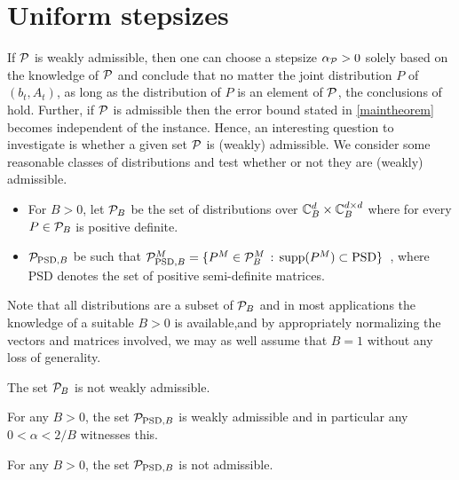 \section{Uniform stepsizes}
If $\P$ is weakly admissible, then one can choose a stepsize $\alpha_{\P}>0$ solely based on the knowledge of $\P$ and
conclude that no matter the joint distribution $P$ of $(b_t,A_t)$, as long as the distribution of $P$ is an element of $\P$, the conclusions of  hold. Further, if $\P$ is admissible then the error bound stated in  \cref{maintheorem} becomes independent of the instance. Hence, an interesting question to investigate is whether a given set $\P$ is (weakly) admissible. We consider some reasonable classes of distributions and test whether or not they are (weakly) admissible.
\begin{definition}
\begin{itemize}[leftmargin=*, before = \leavevmode\vspace{-\baselineskip}]
\item For $B>0$, let $\P_B$ be the set of distributions over $\C_B^{d}\times \C_B^{\dcd}$ where for every $P\in \P_B$ is positive definite.
\item  $\P_{\text{PSD},B}$ be such that  $\P^M_{\text{PSD},B}=\{ P^M \in \P^M_B \,:\,  \supp(P^M)\subset \text{PSD} \}\,$ , where PSD denotes the set of positive semi-definite matrices.
\end{itemize}
\end{definition}
Note that all distributions are a subset of $\P_B$ and in most applications the knowledge of a suitable $B>0$ is available,and by appropriately normalizing the vectors and matrices involved, we may as well assume that $B=1$ without any loss of generality.
\begin{proposition}\label{notwad}
The set $\P_B$ is not weakly admissible.
\end{proposition}
\begin{proposition}
For any $B>0$, the set $\P_{\text{PSD},B}$ is weakly admissible
and in particular any $0<\alpha < 2/B$ witnesses this.
\end{proposition}
\begin{proposition}
For any $B>0$, the set $\P_{\text{PSD},B}$ is not admissible.
\end{proposition}

\begin{comment}
\begin{proof}
Fix an arbitrary $\alpha>0$. We show that there exists $P\in \P$ such that $\rho_\alpha(P)<0$.
For $\epsilon \in (0,1/2)$ let $P=(P^V,P^M)$ be the distribution such that $P^M$ is supported on $\{-I,I\}$ and takes on the value of $I$ with probability $1/2+\epsilon$. Then $A_P = 2\epsilon I \succ 0$, hence $P\in \P_1$. Further, $Q_P = I$.
Hence, $\rhos{P} = 4\epsilon-\alpha$. Hence, if $\epsilon<\alpha/4$, $\rho_\alpha(P)<0$.
\end{proof}
\end{comment}

